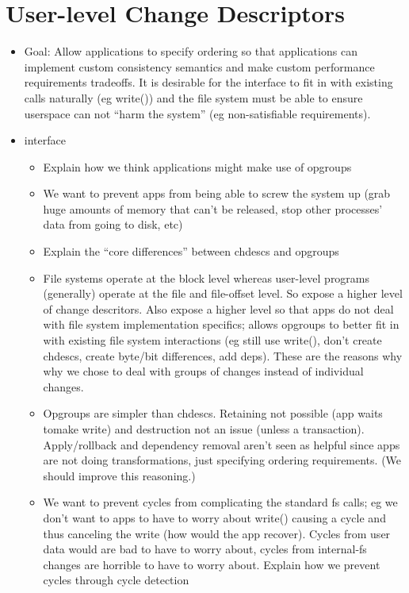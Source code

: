 \section{User-level Change Descriptors}
\begin{itemize}
\item Goal: Allow applications to specify ordering so that
  applications can implement custom consistency semantics and make
  custom performance requirements tradeoffs. It is desirable for the
  interface to fit in with existing calls naturally (eg write()) and
  the file system must be able to ensure userspace can not ``harm the
  system'' (eg non-satisfiable requirements).
\item interface
  \begin{itemize}
  \item Explain how we think applications might make use of opgroups
  \item We want to prevent apps from being able to screw the system up
    (grab huge amounts of memory that can't be released, stop other
    processes' data from going to disk, etc)
  \item Explain the ``core differences'' between chdescs and
    opgroups
  \item File systems operate at the block level whereas user-level
    programs (generally) operate at the file and file-offset level.
    So expose a higher level of change descritors. Also expose a
    higher level so that apps do not deal with file system
    implementation specifics; allows opgroups to better fit in with
    existing file system interactions (eg still use write(), don't
    create chdescs, create byte/bit differences, add deps). These are
    the reasons why why we chose to deal with groups of changes
    instead of individual changes.
  \item Opgroups are simpler than chdescs. Retaining not possible (app
    waits tomake write) and destruction not an issue (unless a
    transaction). Apply/rollback and dependency removal aren't seen as
    helpful since apps are not doing transformations, just specifying
    ordering requirements. (We should improve this reasoning.)
  \item We want to prevent cycles from complicating the standard fs
    calls; eg we don't want to apps to have to worry about write()
    causing a cycle and thus canceling the write (how would the app
    recover). Cycles from user data would are bad to have to worry
    about, cycles from internal-fs changes are horrible to have to
    worry about. Explain how we prevent cycles through cycle detection

\end{itemize}
\end{itemize}
